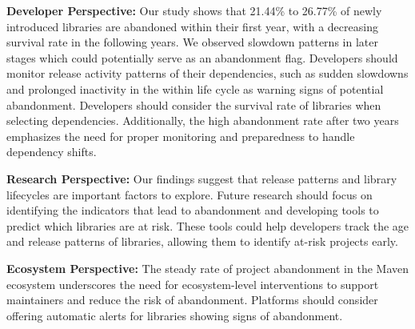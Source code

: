 
\noindent\textbf{Developer Perspective:}
Our study shows that 21.44\% to 26.77\% of newly introduced libraries are abandoned within their first year, with a decreasing survival rate in the following years. We observed slowdown patterns in later stages which could potentially serve as an abandonment flag. Developers should monitor release activity patterns of their dependencies, such as sudden slowdowns and prolonged inactivity in the within life cycle as warning signs of potential abandonment. Developers should consider the survival rate of libraries when selecting dependencies. Additionally, the high abandonment rate after two years emphasizes the need for proper monitoring and preparedness to handle dependency shifts.






\noindent\textbf{Research Perspective:} 
Our findings suggest that release patterns and library lifecycles are important factors to explore. Future research should focus on identifying the indicators that lead to abandonment and developing tools to predict which libraries are at risk. These tools could help developers track the age and release patterns of libraries, allowing them to identify at-risk projects early.


\noindent\textbf{Ecosystem Perspective:}
The steady rate of project abandonment in the Maven ecosystem underscores the need for ecosystem-level interventions to support maintainers and reduce the risk of abandonment. Platforms should consider offering automatic alerts for libraries showing signs of abandonment.
